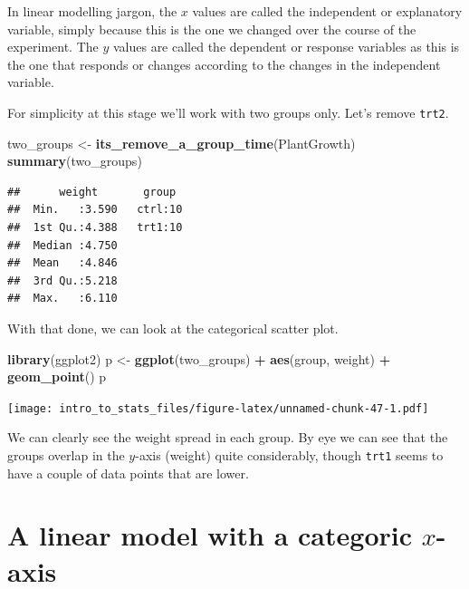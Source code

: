 \documentclass[
]{book}
\newenvironment{Shaded}{\begin{snugshade}}{\end{snugshade}}
\newcommand{\KeywordTok}[1]{\textcolor[rgb]{0.13,0.29,0.53}{\textbf{#1}}}
\newcommand{\NormalTok}[1]{#1}
\newcommand{\OperatorTok}[1]{\textcolor[rgb]{0.81,0.36,0.00}{\textbf{#1}}}
\newcommand{\StringTok}[1]{\textcolor[rgb]{0.31,0.60,0.02}{#1}}
\begin{document}
In linear modelling jargon, the \(x\) values are called the independent or explanatory variable, simply because this is the one we changed over the course of the experiment. The \(y\) values are called the dependent or response variables as this is the one that responds or changes according to the changes in the independent variable.

For simplicity at this stage we'll work with two groups only. Let's remove \texttt{trt2}.

\begin{Shaded}
\begin{Highlighting}[]
\NormalTok{two_groups <-}\StringTok{ }\KeywordTok{its_remove_a_group_time}\NormalTok{(PlantGrowth)}
\KeywordTok{summary}\NormalTok{(two_groups)}
\end{Highlighting}
\end{Shaded}

\begin{verbatim}
##      weight       group   
##  Min.   :3.590   ctrl:10  
##  1st Qu.:4.388   trt1:10  
##  Median :4.750            
##  Mean   :4.846            
##  3rd Qu.:5.218            
##  Max.   :6.110
\end{verbatim}

With that done, we can look at the categorical scatter plot.

\begin{Shaded}
\begin{Highlighting}[]
\KeywordTok{library}\NormalTok{(ggplot2)}
\NormalTok{p <-}\StringTok{ }\KeywordTok{ggplot}\NormalTok{(two_groups) }\OperatorTok{+}\StringTok{ }\KeywordTok{aes}\NormalTok{(group, weight) }\OperatorTok{+}\StringTok{ }\KeywordTok{geom_point}\NormalTok{()}
\NormalTok{p}
\end{Highlighting}
\end{Shaded}

\texttt{[image: intro\_to\_stats\_files/figure-latex/unnamed-chunk-47-1.pdf]}

We can clearly see the weight spread in each group. By eye we can see that the groups overlap in the \(y\)-axis (weight) quite considerably, though \texttt{trt1} seems to have a couple of data points that are lower.

\hypertarget{a-linear-model-with-a-categoric-x-axis}{%
\section{\texorpdfstring{A linear model with a categoric \(x\)-axis}{A linear model with a categoric x-axis}}\label{a-linear-model-with-a-categoric-x-axis}}
\end{document}
